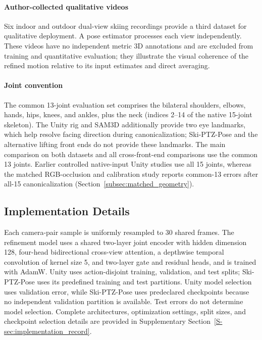 \documentclass[preprint,12pt]{elsarticle}
\begin{document}
\paragraph{Author-collected qualitative videos}
Six indoor and outdoor dual-view skiing recordings provide a third dataset for qualitative deployment. A pose estimator processes each view independently. These videos have no independent metric 3D annotations and are excluded from training and quantitative evaluation; they illustrate the visual coherence of the refined motion relative to its input estimates and direct averaging.

\paragraph{Joint convention}
The common 13-joint evaluation set comprises the bilateral shoulders, elbows, hands, hips, knees, and ankles, plus the neck (indices 2--14 of the native 15-joint skeleton). The Unity rig and SAM3D additionally provide two eye landmarks, which help resolve facing direction during canonicalization; Ski-PTZ-Pose and the alternative lifting front ends do not provide these landmarks. The main comparison on both datasets and all cross-front-end comparisons use the common 13 joints. Earlier controlled native-input Unity studies use all 15 joints, whereas the matched RGB-occlusion and calibration study reports common-13 errors after all-15 canonicalization (Section~\ref{subsec:matched_geometry}).

\subsection{Implementation Details}
\label{subsec:implementation_details}

Each camera-pair sample is uniformly resampled to 30 shared frames. The refinement model uses a shared two-layer joint encoder with hidden dimension 128, four-head bidirectional cross-view attention, a depthwise temporal convolution of kernel size 5, and two-layer gate and residual heads, and is trained with AdamW. Unity uses action-disjoint training, validation, and test splits; Ski-PTZ-Pose uses its predefined training and test partitions. Unity model selection uses validation error, while Ski-PTZ-Pose uses predeclared checkpoints because no independent validation partition is available. Test errors do not determine model selection. Complete architectures, optimization settings, split sizes, and checkpoint selection details are provided in Supplementary Section~\ref{S-sec:implementation_record}.
\end{document}
